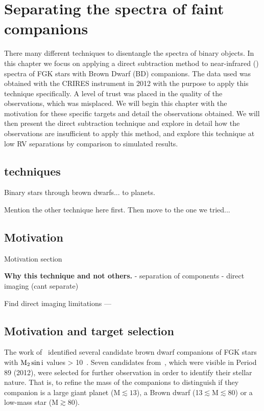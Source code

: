 

\chapter{Separating the spectra of faint companions} %
\label{cha:direct_recovery}

There many different techniques to disentangle the spectra of binary objects. In this chapter we focus on applying a direct subtraction method to near-infrared (\nir{}) spectra of {FGK} stars with Brown Dwarf (BD) companions. The data used was obtained with the {CRIRES} instrument in 2012 with the purpose to apply this technique specifically. A level of trust was placed in the quality of the observations, which was misplaced. We will begin this chapter with the motivation for these specific targets and detail the observations obtained. We will then present the direct subtraction technique and explore in detail how the observations are insufficient to apply this method, and explore this technique at low RV separations by comparison to simulated results.

\section{techniques}
Binary stars through brown dwarfs... to planets.


Mention the other technique here first. Then move to the one we tried...


\section{Motivation}

Motivation section

\textbf{Why this technique and not others.}
- separation of components
- direct imaging (cant separate)


Find direct imaging limitations ---


\section{Motivation and target selection}
\label{sec:motivation}
The work of~\citet{sahlmann_search_2011} identified several candidate brown dwarf companions of FGK stars with \(\rm M_2 \sin{i}\) values > 10~\Mjup{}. Seven candidates from~\citet{sahlmann_search_2011}, which were visible in Period 89 (2012), were selected for further observation in order to identify their stellar nature. That is, to refine the mass of the companions to distinguish if they companion is a large giant planet (M$\apprle13$\Mjup), a Brown dwarf (13$\apprle $M$\apprle80$\Mjup) or a low-mass star (M$\apprge80$\Mjup).

